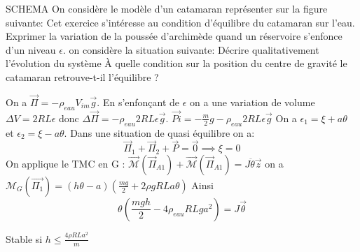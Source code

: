 \begin{Exercise}[title=Catamaran]
	SCHEMA
	On considère le modèle d'un catamaran représenter sur la figure suivante:
	Cet exercice s'intéresse au condition d'équilibre du catamaran sur l'eau.
	\Question Exprimer la variation de la poussée d'archimède quand un réservoire s'enfonce d'un niveau $\epsilon$.
	\Question on considère la situation suivante:
	\subQuestion Décrire qualitativement l'évolution du système
	\subQuestion À quelle condition sur la position du centre de gravité le catamaran retrouve-t-il l'équilibre ?
\end{Exercise}
\begin{Answer}
	\Question On a $\vec{\Pi} = -\rho_{eau}V_{im}\vec{g}$. En s'enfonçant de $\epsilon$ on a une variation de volume $\Delta V = 2RL \epsilon $ donc $\Delta \vec{\Pi} = -\rho_{eau}2RL\epsilon\vec{g}$.
	\Question $\vec{Pi}= -\frac{m}{2}g -\rho_{eau}2RL\epsilon \vec{g}$
	On a  $\epsilon_1 = \xi +a \theta$ et $\epsilon_2 = \xi -a\theta$.
	Dans une situation de quasi équilibre on a:
	\[\vec{\Pi}_1+\vec{\Pi}_2+\vec{P} = \vec{0} \implies \xi = 0 \]
	On applique le TMC en G :
	$\vec{\mathcal{M}}(\vec{\Pi}_{A1}) + \vec{\mathcal{M}}(\vec{\Pi}_{A1}) = J \ddot{\theta} \vec{z}$
	on a $\mathcal{M}_{G}(\vec{\Pi_1}) = (h\theta-a)\left(\frac{mg}{2}+2\rho g  R L a\theta \right)$
	Ainsi
	\[
	\theta (\frac{mgh}{2} -4\rho_{eau} RL ga^2) = J \vec{\theta}
	\]

	Stable si $ h\leq \frac{4\rho RLa^2}{m}$
\end{Answer}
